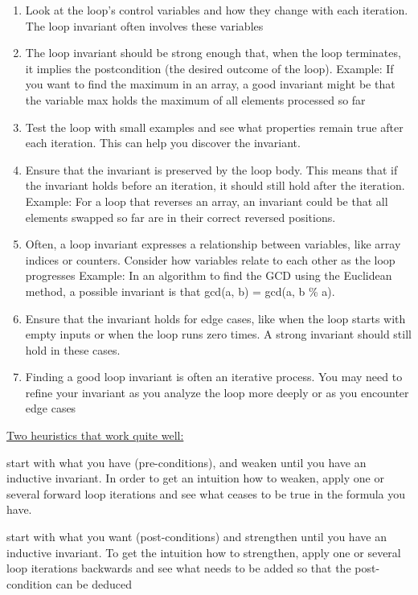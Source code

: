 \documentclass[landscape, a4paper]{article}
\begin{document}
\begin{minipage}[t]{0.2\linewidth}
\begin{betterlist}
\begin{enumerate}
			\item Look at the loop's control variables and how they change with each iteration. The loop invariant often involves these variables
			\item The loop invariant should be strong enough that, when the loop terminates, it implies the postcondition (the desired outcome of the loop). Example: If you want to find the maximum in an array, a good invariant might be that the variable max holds the maximum of all elements processed so far
			\item Test the loop with small examples and see what properties remain true after each iteration. This can help you discover the invariant.
			\item Ensure that the invariant is preserved by the loop body. This means that if the invariant holds before an iteration, it should still hold after the iteration. Example: For a loop that reverses an array, an invariant could be that all elements swapped so far are in their correct reversed positions.
			\item Often, a loop invariant expresses a relationship between variables, like array indices or counters. Consider how variables relate to each other as the loop progresses Example: In an algorithm to find the GCD using the Euclidean method, a possible invariant is that gcd(a, b) = gcd(a, b \% a).
			\item Ensure that the invariant holds for edge cases, like when the loop starts with empty inputs or when the loop runs zero times. A strong invariant should still hold in these cases.
			\item Finding a good loop invariant is often an iterative process. You may need to refine your invariant as you analyze the loop more deeply or as you encounter edge cases
		\end{enumerate}
		\item \underline{Two heuristics that work quite well:}
		\begin{betterlist}
			\item start with what you have (pre-conditions), and weaken until you have an inductive invariant. In order to get an intuition how to weaken, apply one or several forward loop iterations and see what ceases to be true in the formula you have.
			\item start with what you want (post-conditions) and strengthen until you have an inductive invariant. To get the intuition how to strengthen, apply one or several loop iterations backwards and see what needs to be added so that the post-condition can be deduced

\end{betterlist}
\end{betterlist}
\end{minipage}
\end{document}
